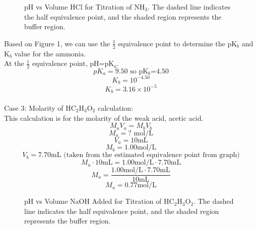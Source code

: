 \documentclass[10pt, letterpaper]{article}
\begin{document}
\begin{figure}[H]
\centering
{}
\caption{pH vs Volume HCl for Titration of NH$_3$. The dashed line indicates the half equivalence point, and the shaded region represents the buffer region.}
\end{figure}

Based on Figure 1, we can use the $\frac{1}{2}$ equivalence point to determine the pK$_{b}$ and K$_{b}$ value for the ammonia.\\
At the $\frac{1}{2}$ equivalence point, pH=pK$_{a}$.
$$pK_{a}=9.50 \text{ so pK$_{b}$=4.50}$$
$$K_{b}=10^{-4.50}$$
$$K_{b}=3.16\times 10^{-5}$$
\\


Case 3: Molarity of HC$_{2}$H$_{3}$O$_{2}$ calculation:
\\
This calculation is for the molarity of the weak acid, acetic acid.
\begin{equation}
M_{a}V_{a}=M_{b}V_{b}
\end{equation}
$$M_{a}=? \text{ mol/L}$$
$$V_{a}=10\text{mL}$$
$$M_{b}=1.00\text{mol/L}$$
$$V_{b}=7.70 \text{mL (taken from the estimated equivalence point from graph)}$$
$$M_{a}\cdot10\text{mL}=1.00\text{mol/L}\cdot7.70\text{mL}$$
$$M_{a}=\frac{1.00\text{mol/L}\cdot7.70\text{mL}}{10\text{mL}}$$
$$M_{a}=0.77\text{mol/L}$$

\begin{figure}[H]
\centering
{}
\caption{pH vs Volume NaOH Added for Titration of HC$_2$H$_3$O$_2$. The dashed line indicates the half equivalence point, and the shaded region represents the buffer region.}
\end{figure}
\end{document}
